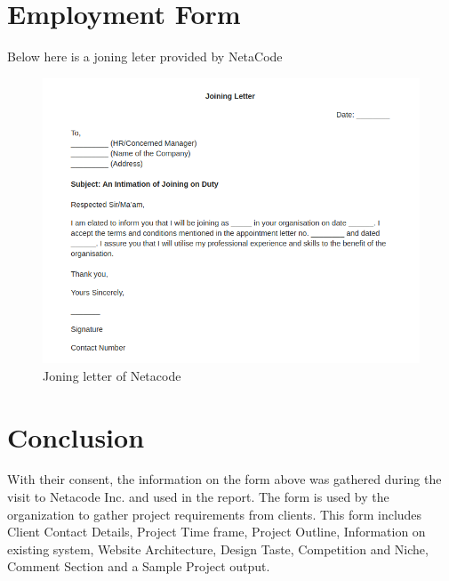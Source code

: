 \documentclass[a4paper,12pt]{report}
\begin{document}
\section{Employment Form}
Below here is a joning leter provided by NetaCode
\begin{figure}[h]
	\centering
	\includegraphics[width=0.8\linewidth]{10_2}
	\caption{Joning letter of Netacode }
	\label{fig:10_2}
\end{figure}

\section{Conclusion}

With their consent, the information on the form above was gathered during the visit to Netacode Inc. and used in the report. The form is used by the organization to gather project requirements from clients. This form includes Client Contact Details, Project Time frame, Project Outline, Information on existing system, Website Architecture, Design Taste, Competition and Niche, Comment Section and a Sample Project output.
\end{document}
